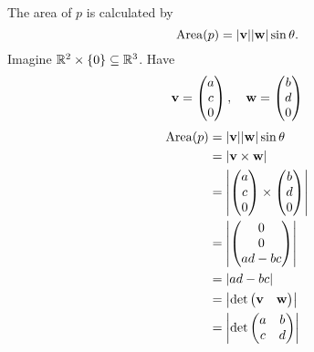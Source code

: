 \documentclass[10pt, a4paper]{article}
\begin{document}
The area of $p$ is calculated by
\[
\mathrm{Area}(p) = |\mathbf{v}||\mathbf{w}|\sin\theta.
\]
Imagine $\mathbb{R} ^ 2 \times \{0\} \subseteq \mathbb{R} ^ 3$.
Have
\[
\mathbf{v} = \begin{pmatrix}
    a \\ c \\ 0
\end{pmatrix},
\quad
\mathbf{w} = \begin{pmatrix}
    b \\ d \\ 0
\end{pmatrix}
\]
\begin{align*}
    \mathrm{Area}(p) &= |\mathbf{v}||\mathbf{w}|\sin\theta \\
    &= |\mathbf{v \times w}| \\
    &= \left|\begin{pmatrix}
        a \\ c \\ 0
    \end{pmatrix} \times \begin{pmatrix}
        b \\ d \\ 0
    \end{pmatrix}\right| \\
    &=
    \left|\begin{pmatrix}
        0 \\ 0 \\ ad - bc
    \end{pmatrix}\right| \\
    &= |ad - bc| \\
    &= \left|\det\begin{pmatrix}
        \mathbf{v} & \mathbf{w}
    \end{pmatrix}\right| \\
    &= \left|\det\begin{pmatrix}
        a & b \\ c & d
    \end{pmatrix}\right|
\end{align*}
\end{document}
